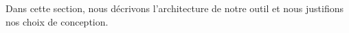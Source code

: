 Dans cette section, nous décrivons l'architecture de notre outil et
nous justifions nos choix de conception.


